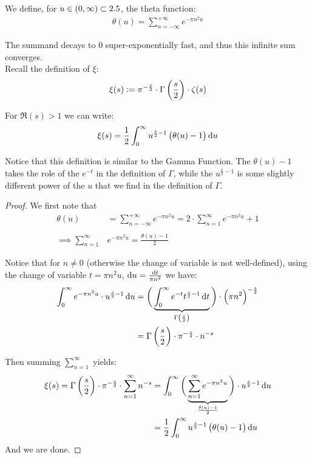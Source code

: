 \begin{definition}
We define, for $u \in (0,\infty) \subset 2.5$, the theta function:
\begin{align*}
    \theta(u) = \sum_{n=-\infty}^{+\infty} e^{- \pi n^2 u}
\end{align*}
\end{definition}
The summand decays to $0$ super-exponentially fast, and thus this infinite sum converges.\\

Recall the definition of $\xi$:
\begin{align*}
    \xi(s) \vcentcolon = \pi^{-\frac{s}{2}} \cdot \Gamma\left( \frac{s}{2} \right) \cdot \zeta(s)
\end{align*}

\begin{lemma}
For $\Re(s) > 1$ we can write:
\begin{align*}
    \xi(s) = \frac{1}{2} \int_0^\infty u^{\frac{s}{2} - 1} \br{\theta(u) - 1} \dif u
\end{align*}
\end{lemma}

\begin{note}
Notice that this definition is similar to the Gamma Function. The $\theta(u) - 1$ takes the role of the $e^{-t}$ in the definition of $\Gamma$, while the $u^{\frac{s}{2} - 1} $ is some slightly different power of the $u$ that we find in the definition of $\Gamma$.\\
\end{note}

\begin{proof}
We first note that
\begin{align*}
    \theta(u) &= \sum_{n=-\infty}^{+\infty} e^{- \pi n^2 u} = 2 \cdot \sum_{n=1 }^{\infty} e^{- \pi n^2 u} + 1\\\\
    \implies  \sum_{n=1 }^{\infty}& e^{- \pi n^2 u} = \frac{\theta(u) - 1}{2}
\end{align*}

Notice that for $n  \neq 0$ (otherwise the change of variable is not well-defined), using the change of variable $t = \pi n^2 u$, $\dif u = \frac{\dif t}{ \pi n^2}$ we have:
\begin{align*}
    \int_0^\infty e^{- \pi n^2 u} \cdot  u^{\frac{s}{2} -1} \dif u &= \bigg( \underbrace{ \int_0^\infty e^{-t} t^{\frac{s}{2} - 1} \dif t}_{\Gamma\br{\frac{s}{2}}} \bigg) \cdot \br{\pi n^2}^{- \frac{s}{2}} \\
    &= \Gamma\br{\frac{s}{2}} \cdot \pi^{- \frac{s}{2}} \cdot n^{-s}
\end{align*}

Then summing $\sum_{n=1}^\infty$ yields:
\begin{align*}
    \xi(s) = \Gamma\br{\frac{s}{2}} \cdot \pi^{- \frac{s}{2}} \cdot \sum_{n=1}^\infty   n^{-s} &= \int_0^\infty \bigg( \underbrace{ \sum_{n=1}^\infty  e^{- \pi n^2 u} }_{\frac{\theta(u) - 1}{2}}\bigg) \cdot  u^{\frac{s}{2} -1} \dif u\\
    &=\frac{1}{2} \int_0^\infty u^{\frac{s}{2} - 1} \br{\theta(u) - 1} \dif u
\end{align*}
And we are done.
\end{proof}

